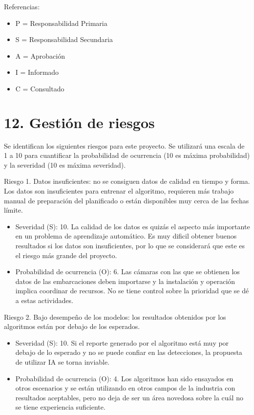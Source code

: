\documentclass[11pt]{charter}
\begin{document}
\begin{table}[htpb]
{\begin{tabular}{|c|c|c|c|c|}
 
\end{tabular}%
}
\end{table}

{\footnotesize
Referencias:
\begin{itemize}
	\item P = Responsabilidad Primaria
	\item S = Responsabilidad Secundaria
	\item A = Aprobación
	\item I = Informado
	\item C = Consultado
\end{itemize}
} %

\section{12. Gestión de riesgos}
\label{sec:riesgos}

Se identifican los siguientes riesgos para este proyecto. Se utilizará una escala de 1 a 10 para cuantificar la probabilidad de ocurrencia (10 es máxima probabilidad) y la severidad (10 es máxima severidad).

Riesgo 1. Datos insuficientes: no se consiguen datos de calidad en tiempo y forma. Los datos son insuficientes para entrenar el algoritmo, requieren más trabajo manual de preparación del planificado o están disponibles muy cerca de las fechas límite.
\begin{itemize}
	\item Severidad (S): 10. La calidad de los datos es quizás el aspecto más importante en un problema de aprendizaje automático. Es muy dificil obtener buenos resultados si los datos son insuficientes, por lo que se considerará que este es el riesgo más grande del proyecto.
	\item Probabilidad de ocurrencia (O): 6. Las cámaras con las que se obtienen los datos de las embarcaciones deben importarse y la instalación y operación implica coordinar de recursos. No se tiene control sobre la prioridad que se dé a estas actividades. 
\end{itemize}

Riesgo 2. Bajo desempeño de los modelos: los resultados obtenidos por los algoritmos están por debajo de los esperados.
\begin{itemize}
	\item Severidad (S): 10. Si el reporte generado por el algoritmo está muy por debajo de lo esperado y no se puede confiar en las detecciones, la propuesta de utilizar IA se torna inviable.
	\item Probabilidad de ocurrencia (O): 4. Los algoritmos han sido ensayados en otros escenarios y se están utilizando en otros campos de la industria con resultados aceptables, pero no deja de ser un área novedosa sobre la cuál no se tiene experiencia suficiente.
\end{itemize}
\end{document}
